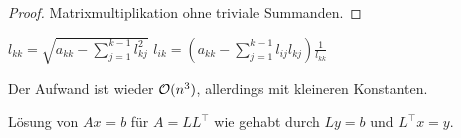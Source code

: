 \documentclass{report}
\begin{document}
\begin{proof}
	Matrixmultiplikation ohne triviale Summanden.
\end{proof}
\begin{algorithm}
	\begin{algorithmic}[1]
			\State $l_{kk} = \sqrt{a_{kk} - \sum_{j = 1}^{k-1}l_{kj}^2}$
				\State $l_{ik} = (a_{kk} - \sum_{j = 1}^{k-1} l_{ij}l_{kj}) \frac{1}{l_{kk}}$
			\EndFor
		\EndFor
	\end{algorithmic}
\end{algorithm}
\begin{proposition}
	Der Aufwand ist wieder $\mathcal{O}(n^3)$, allerdings mit kleineren Konstanten.
\end{proposition}
\begin{proposition}
	Lösung von $Ax = b$ für $A = LL^\top$ wie gehabt durch $Ly = b$ und $L^\top x = y$.
\end{proposition}
\end{document}
